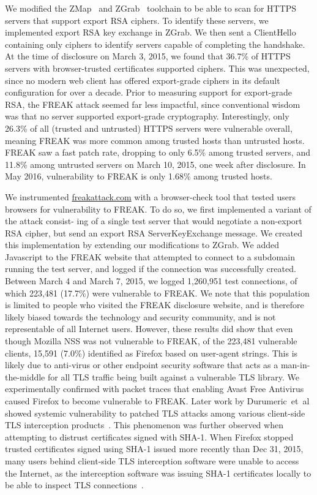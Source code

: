 We modified the ZMap~\cite{zmap-2013} and ZGrab~\cite{zgrab-github} toolchain
to be able to scan for HTTPS servers that support export RSA ciphers. To
identify these servers, we implemented export RSA key exchange in ZGrab. We
then sent a \textsf{ClientHello} containing only \rsaexp{} ciphers to
identify servers capable of completing the handshake. At the time of
disclosure on March 3, 2015, we found that 36.7\% of HTTPS servers with
browser-trusted certificates supported \rsaexp{} ciphers. This was
unexpected, since no modern web client has offered export-grade ciphers in
its default configuration for over a decade. Prior to measuring support for
export-grade RSA, the FREAK attack seemed far less impactful, since
conventional wisdom was that no server supported export-grade cryptography.
Interestingly, only 26.3\% of all (trusted and untrusted) HTTPS servers were
vulnerable overall, meaning FREAK was more common among trusted hosts than
untrusted hosts. FREAK saw a fast patch rate, dropping to only 6.5\% among
trusted servers, and 11.8\% among untrusted servers on March 10, 2015, one
week after disclosure. In May 2016, vulnerability to FREAK is only 1.68\%
among trusted hosts.

We instrumented \url{freakattack.com} with a browser-check tool that tested
users browsers for vulnerability to FREAK. To do so, we first implemented a
variant of the attack consist- ing of a single test server that would
negotiate a non-export RSA cipher, but send an export RSA ServerKeyExchange
message. We created this implementation by extending our modifications to
ZGrab. We added Javascript to the FREAK website that attempted to connect to
a subdomain running the test server, and logged if the connection was
successfully created. Between March 4 and March 7, 2015, we logged 1,260,951
test connections, of which 223,481 (17.7\%) were vulnerable to FREAK. We note
that this population is limited to people who visited the FREAK disclosure
website, and is therefore likely biased towards the technology and security
community, and is not representable of all Internet users. However, these
results did show that even though Mozilla NSS was not vulnerable to FREAK, of
the 223,481 vulnerable clients, 15,591 (7.0\%) identified as Firefox based on
user-agent strings. This is likely due to anti-virus or other endpoint
security software that acts as a man-in-the-middle for all TLS traffic being
built against a vulnerable TLS library. We experimentally confirmed with
packet traces that enabling Avast Free Antivirus caused Firefox to become
vulnerable to FREAK. Later work by Durumeric~et~al showed systemic
vulnerability to patched TLS attacks among various client-side TLS
interception products~\cite{tls-interception-2017}. This phenomenon was
further observed when attempting to distrust certificates signed with SHA-1.
When Firefox stopped trusted certificates signed using SHA-1 issued more
recently than Dec 31, 2015, many users behind client-side TLS interception
software were unable to access the Internet, as the interception software was
issuing SHA-1 certificates locally to be able to inspect TLS
connections~\cite{firefox-undo-sha1}.


